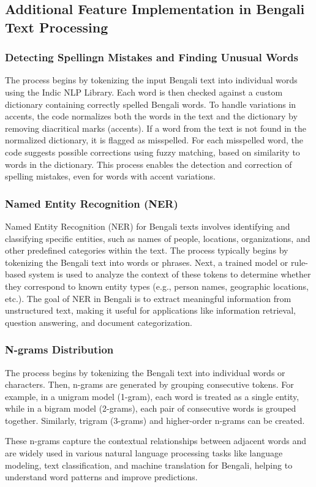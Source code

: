 \subsection{Additional Feature Implementation in Bengali Text Processing}

\subsubsection{Detecting Spellingn Mistakes and Finding Unusual Words}

The process begins by tokenizing the input Bengali text into individual words using the Indic NLP Library. Each word is then checked against a custom dictionary containing correctly spelled Bengali words. To handle variations in accents, the code normalizes both the words in the text and the dictionary by removing diacritical marks (accents). If a word from the text is not found in the normalized dictionary, it is flagged as misspelled. For each misspelled word, the code suggests possible corrections using fuzzy matching, based on similarity to words in the dictionary. This process enables the detection and correction of spelling mistakes, even for words with accent variations.

\subsubsection{Named Entity Recognition (NER)}

Named Entity Recognition (NER) for Bengali texts involves identifying and classifying specific entities, such as names of people, locations, organizations, and other predefined categories within the text. The process typically begins by tokenizing the Bengali text into words or phrases. Next, a trained model or rule-based system is used to analyze the context of these tokens to determine whether they correspond to known entity types (e.g., person names, geographic locations, etc.). The goal of NER in Bengali is to extract meaningful information from unstructured text, making it useful for applications like information retrieval, question answering, and document categorization.

\subsubsection{N-grams Distribution}

The process begins by tokenizing the Bengali text into individual words or characters. Then, n-grams are generated by grouping consecutive tokens. For example, in a unigram model (1-gram), each word is treated as a single entity, while in a bigram model (2-grams), each pair of consecutive words is grouped together. Similarly, trigram (3-grams) and higher-order n-grams can be created.

These n-grams capture the contextual relationships between adjacent words and are widely used in various natural language processing tasks like language modeling, text classification, and machine translation for Bengali, helping to understand word patterns and improve predictions.